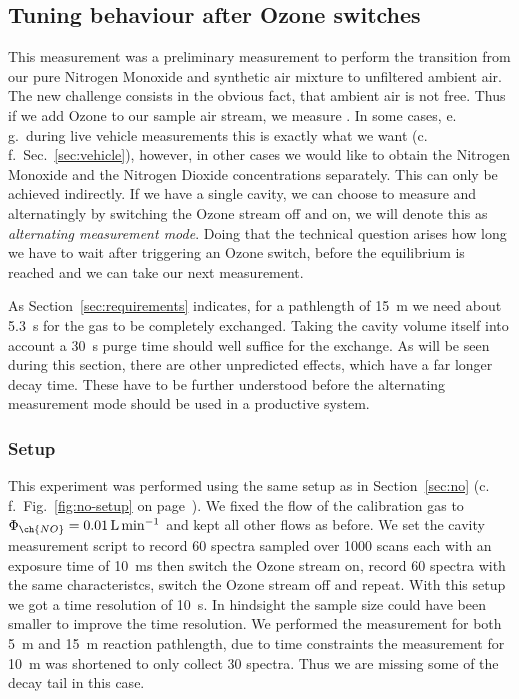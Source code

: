 \subsection{Tuning behaviour after Ozone switches}
\label{sec:switch}

This measurement was a preliminary measurement to perform the
transition from our pure Nitrogen Monoxide and synthetic air mixture
to unfiltered ambient air. The new challenge consists in the obvious
fact, that ambient air is not  free. Thus if we add Ozone to
our sample air stream, we measure . In some
cases, e.\,g.\ during live vehicle measurements this is exactly what
we want (c.\,f.~Sec.~\ref{sec:vehicle}), however, in other cases we
would like to obtain the Nitrogen Monoxide and the Nitrogen Dioxide
concentrations separately. This can only be achieved indirectly. If we
have a single cavity, we can choose to measure  and 
alternatingly by switching the Ozone stream off and on, we will denote
this as \emph{alternating measurement mode}. Doing that the technical
question arises how long we have to wait after triggering an Ozone
switch, before the equilibrium is reached and we can take our next
measurement.

As Section~\ref{sec:requirements} indicates, for a pathlength of
\SI{15}{\meter} we need about \SI{5.3}{\second} for the gas to be
completely exchanged. Taking the cavity volume itself into account a
\SI{30}{\second} purge time should well suffice for the exchange. As
will be seen during this section, there are other unpredicted effects,
which have a far longer decay time. These have to be further
understood before the alternating measurement mode should be used in a
productive system.

\subsubsection{Setup}
\label{sec:switch-setup}

This experiment was performed using the same setup as in
Section~\ref{sec:no} (c.\,f.\ Fig.~\ref{fig:no-setup} on
page~\pageref{fig:no-setup}). We fixed the flow of the 
calibration gas to $\Phi_{\ch{NO}} = \SI{0.01}{\liter\per\minute}$ and
kept all other flows as before. We set the cavity measurement script
to record 60 spectra sampled over 1000 scans each with an exposure
time of \SI{10}{\milli\second} then switch the Ozone stream on, record
60 spectra with the same characteristcs, switch the Ozone stream off
and repeat. With this setup we got a time resolution of
\SI{10}{\second}. In hindsight the sample size could have been
smaller to improve the time resolution. We performed the measurement
for both \SI{5}{\meter} and \SI{15}{\meter} reaction pathlength, due
to time constraints the measurement for \SI{10}{\meter} was shortened
to only collect 30 spectra. Thus we are missing some of the decay tail
in this case.

